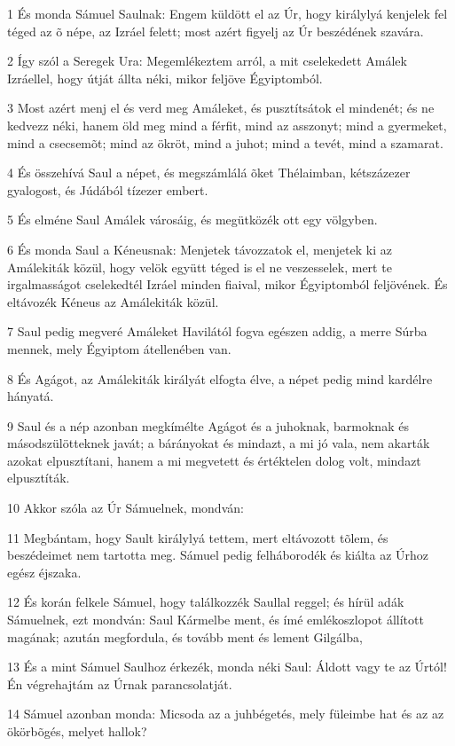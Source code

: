 \par 1 És monda Sámuel Saulnak: Engem küldött el az Úr, hogy királylyá kenjelek fel téged az õ népe, az Izráel felett; most azért figyelj az Úr beszédének szavára.
\par 2 Így szól a Seregek Ura: Megemlékeztem arról, a mit cselekedett Amálek Izráellel, hogy útját állta néki, mikor feljöve Égyiptomból.
\par 3 Most azért menj el és verd meg Amáleket, és pusztítsátok el mindenét; és ne kedvezz néki, hanem öld meg mind a férfit, mind az asszonyt; mind a gyermeket, mind a csecsemõt; mind az ökröt, mind a juhot; mind a tevét, mind a szamarat.
\par 4 És összehívá Saul a népet, és megszámlálá õket Thélaimban, kétszázezer gyalogost, és Júdából tízezer embert.
\par 5 És elméne Saul Amálek városáig, és megütközék ott egy völgyben.
\par 6 És monda Saul a Kéneusnak: Menjetek távozzatok el, menjetek ki az Amálekiták közül, hogy velök együtt téged is el ne veszesselek, mert te irgalmasságot cselekedtél Izráel minden fiaival, mikor Égyiptomból feljövének. És eltávozék Kéneus az Amálekiták közül.
\par 7 Saul pedig megveré Amáleket Havilától fogva egészen addig, a merre Súrba mennek, mely Égyiptom átellenében van.
\par 8 És Agágot, az Amálekiták királyát elfogta élve, a népet pedig mind kardélre hányatá.
\par 9 Saul és a nép azonban megkímélte Agágot és a juhoknak, barmoknak és másodszülötteknek javát; a bárányokat és mindazt, a mi jó vala, nem akarták azokat elpusztítani, hanem a mi megvetett és értéktelen dolog volt, mindazt elpusztíták.
\par 10 Akkor szóla az Úr Sámuelnek, mondván:
\par 11 Megbántam, hogy Sault királylyá tettem, mert eltávozott tõlem, és beszédeimet nem tartotta meg. Sámuel pedig felháborodék és kiálta az Úrhoz egész éjszaka.
\par 12 És korán felkele Sámuel, hogy találkozzék Saullal reggel; és hírül adák Sámuelnek, ezt mondván: Saul Kármelbe ment, és ímé emlékoszlopot állított magának; azután megfordula, és tovább ment és lement Gilgálba,
\par 13 És a mint Sámuel Saulhoz érkezék, monda néki Saul: Áldott vagy te az Úrtól! Én végrehajtám az Úrnak parancsolatját.
\par 14 Sámuel azonban monda: Micsoda az a juhbégetés, mely füleimbe hat és az az ökörbõgés, melyet hallok?
